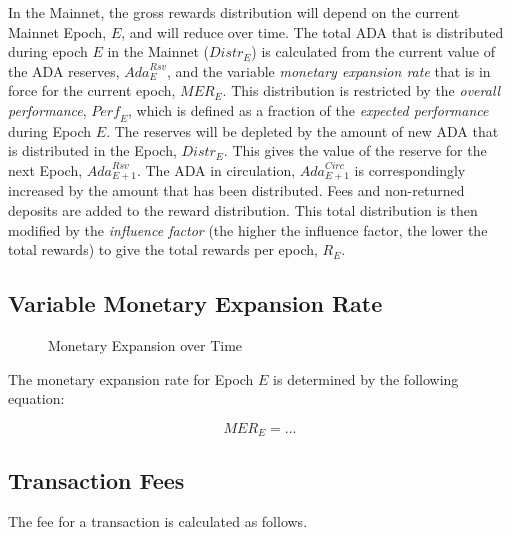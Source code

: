 \documentclass[11pt,a4paper,dvipsnames,twosided,final]{article}
\newcommand{\khcomment}[1]{\todo[color=blue!20]{KH: #1}}
\newcommand{\ada}{ADA{}}
\begin{document}
\noindent
In the Mainnet, the gross rewards distribution will depend on the current Mainnet Epoch, $E$, and will reduce over time.
The total \ada{} that is distributed during epoch $E$ in the Mainnet (${\textit{Distr}}_E$) is calculated from the current
value of the \ada{} reserves, $\textit{Ada}^{\textit{Rsv}}_E$, and the variable \emph{monetary expansion rate} that is in force for
the current epoch, $\textit{MER}_E$.
%
This distribution is restricted by the \emph{overall performance}, $\textit{Perf}_E$, which is defined as a fraction of the \emph{expected performance} during Epoch $E$.
%
The reserves will be depleted by the amount of new \ada{} that is distributed in the Epoch, $\textit{Distr}_E$. This gives the
value of the reserve for the next Epoch, $\textit{Ada}^{\textit{Rsv}}_{E+1}$.  The \ada{} in circulation, $\textit{Ada}^{\textit{Circ}}_{E+1}$
is correspondingly increased by the amount that has been distributed.
%
Fees and non-returned deposits are added to the reward distribution.  This total distribution is then modified by the \emph{influence factor}
(the higher the influence factor, the lower the total rewards) to give the total rewards per epoch, $R_E$.

%

\subsection{Variable Monetary Expansion Rate}
\label{sec:expansion}

\begin{figure}[h!]
  \begin{center}
  \end{center}
  \caption{Monetary Expansion over Time}
\end{figure}

The monetary expansion rate for Epoch $E$ is determined by the following equation:

$$
  \textit{MER}_E = ...
$$

\subsection{Transaction Fees}
\label{sec:fees}

The fee for a transaction is calculated as follows.
\end{document}
